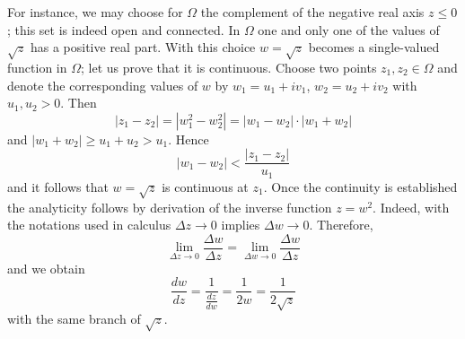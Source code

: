 For instance, we may choose for $\Omega$ the complement of the negative real axis $z \leq 0$; this set is indeed open and connected. In $\Omega$ one and only one of the values of $\sqrt{z}$ has a positive real part. With this choice $w = \sqrt{z}$ becomes a single-valued function in $\Omega$; let us prove that it is continuous. Choose two points $z_1, z_2 \in \Omega$ and denote the corresponding values of $w$ by $w_1 = u_1 + iv_1$, $w_2 = u_2 + iv_2$ with $u_1, u_2 > 0$. Then
\begin{equation*}
\left| z _ {1} - z _ {2} \right| = \left| w _ {1} ^ {2} - w _ {2} ^ {2} \right| = \left| w _ {1} - w _ {2} \right| \cdot \left| w _ {1} + w _ {2} \right|
\end{equation*}
and $|w_{1} + w_{2}| \geq u_{1} + u_{2} > u_{1}$. Hence
\begin{equation*}
\left| w _ {1} - w _ {2} \right| <   \frac {\left| z _ {1} - z _ {2} \right|}{u _ {1}}
\end{equation*}
and it follows that $w = \sqrt{z}$ is continuous at $z_{1}$. Once the continuity is established the analyticity follows by derivation of the inverse function $z = w^{2}$. Indeed, with the notations used in calculus $\Delta z \to 0$ implies $\Delta w \to 0$. Therefore,
\begin{equation*}
\lim _ {\Delta z \to 0} \frac {\Delta w}{\Delta z} = \lim _ {\Delta w \to 0} \frac {\Delta w}{\Delta z}
\end{equation*}
and we obtain
\begin{equation*}
{\frac {d w}{d z}} = {\frac {1}{\frac {d z}{d w}}} = {\frac {1}{2 w}} = {\frac {1}{2 \sqrt {z}}}
\end{equation*}
with the same branch of $\sqrt{z}$.

